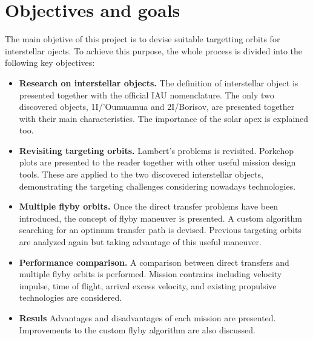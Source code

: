 \section{Objectives and goals}

The main objetive of this project is to devise suitable targetting orbits for
interstellar ojects. To achieve this purpose, the whole process is divided
into the following key objectives:

\begin{itemize}

    \item \textbf{Research on interstellar objects.}
        The definition of interstellar object is presented together with the
        official IAU nomenclature. The only two discovered objects,
        1I/'Oumuamua and 2I/Borisov, are presented together with their main
        characteristics. The importance of the solar apex is explained
        too.

    \item \textbf{Revisiting targeting orbits.}
        Lambert's problems is revisited. Porkchop plots are presented to the
        reader together with other useful mission design tools. These are
        applied to the two discovered interstellar objects, demonstrating the
        targeting challenges considering nowadays technologies.

    \item \textbf{Multiple flyby orbits.}
        Once the direct transfer problems have been introduced, the concept of
        flyby maneuver is presented. A custom algorithm searching for an
        optimum transfer path is devised. Previous targeting orbits are
        analyzed again but taking advantage of this useful maneuver.

   \item \textbf{Performance comparison.}
        A comparison between direct transfers and multiple flyby orbits is
        performed. Mission contrains including velocity impulse, time of
        flight, arrival excess velocity, and existing propulsive technologies 
        are considered.

   \item \textbf{Resuls}
        Advantages and disadvantages of each mission are presented. Improvements
        to the custom flyby algorithm are also discussed.
\end{itemize}
